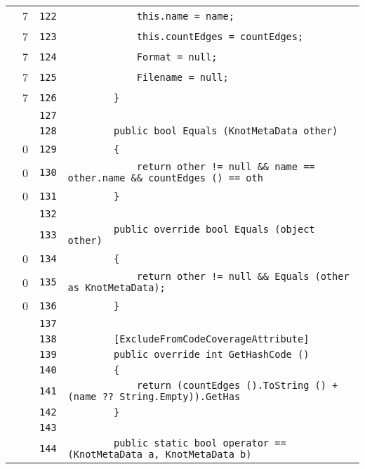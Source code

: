 \documentclass[a4paper,10pt]{article}
\begin{document}
\begin{longtable}[l]{lrrl}
\cellcolor{green} & 7 & \verb~122~ & \verb~            this.name = name;~\\
\cellcolor{green} & 7 & \verb~123~ & \verb~            this.countEdges = countEdges;~\\
\cellcolor{green} & 7 & \verb~124~ & \verb~            Format = null;~\\
\cellcolor{green} & 7 & \verb~125~ & \verb~            Filename = null;~\\
\cellcolor{green} & 7 & \verb~126~ & \verb~        }~\\
\cellcolor{gray} &  & \verb~127~ & \verb~~\\
\cellcolor{gray} &  & \verb~128~ & \verb~        public bool Equals (KnotMetaData other)~\\
\cellcolor{red} & 0 & \verb~129~ & \verb~        {~\\
\cellcolor{red} & 0 & \verb~130~ & \verb~            return other != null && name == other.name && countEdges () == oth~\\
\cellcolor{red} & 0 & \verb~131~ & \verb~        }~\\
\cellcolor{gray} &  & \verb~132~ & \verb~~\\
\cellcolor{gray} &  & \verb~133~ & \verb~        public override bool Equals (object other)~\\
\cellcolor{red} & 0 & \verb~134~ & \verb~        {~\\
\cellcolor{red} & 0 & \verb~135~ & \verb~            return other != null && Equals (other as KnotMetaData);~\\
\cellcolor{red} & 0 & \verb~136~ & \verb~        }~\\
\cellcolor{gray} &  & \verb~137~ & \verb~~\\
\cellcolor{gray} &  & \verb~138~ & \verb~        [ExcludeFromCodeCoverageAttribute]~\\
\cellcolor{gray} &  & \verb~139~ & \verb~        public override int GetHashCode ()~\\
\cellcolor{gray} &  & \verb~140~ & \verb~        {~\\
\cellcolor{gray} &  & \verb~141~ & \verb~            return (countEdges ().ToString () + (name ?? String.Empty)).GetHas~\\
\cellcolor{gray} &  & \verb~142~ & \verb~        }~\\
\cellcolor{gray} &  & \verb~143~ & \verb~~\\
\cellcolor{gray} &  & \verb~144~ & \verb~        public static bool operator == (KnotMetaData a, KnotMetaData b)~\\

\end{longtable}
\end{document}
